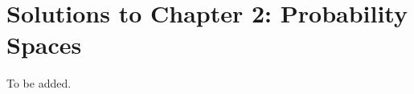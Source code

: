 \section{Solutions to Chapter 2: Probability Spaces}
\label{sec:solutions-chapter-2}

To be added.


